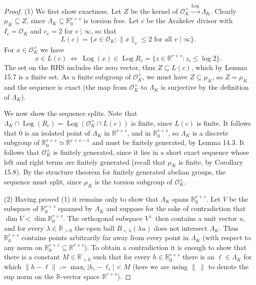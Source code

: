 \documentclass[UTF8,11pt]{ctexart}
\begin{document}
\begin{proof}
(1) We first show exactness. Let $Z$ be the kernel of $\mathcal O_K^\times\xrightarrow{\operatorname{Log}}\Lambda_K$. Clearly $\mu_K\subseteq Z$, since $\Lambda_K\subseteq\mathbb R^{r+s}_0$ is torsion free. Let $c$ be the Arakelov divisor with $I_c=\mathcal O_K$ and $c_v=2$ for $v\mid\infty$, so that
\[
L(c)=\{x\in\mathcal O_K:\|x\|_v\leq2\text{ for all }v\mid\infty\}.
\]
For $x\in\mathcal O_K^\times$ we have
\[
x\in L(c)\ \Longleftrightarrow\ \operatorname{Log}(x)\in\operatorname{Log}R_c
=\{z\in\mathbb R^{r+s}:z_i\leq\log2\}.
\]
The set on the RHS includes the zero vector, thus $Z\subseteq L(c)$, which by Lemma 15.7 is a finite set. As a finite subgroup of $\mathcal O_K^\times$, we must have $Z\subseteq\mu_K$, so $Z=\mu_K$ and the sequence is exact (the map from $\mathcal O_K^\times$ to $\Lambda_K$ is surjective by the definition of $\Lambda_K$).

We now show the sequence splits. Note that
$\Lambda_K\cap\operatorname{Log}(R_c)=\operatorname{Log}(\mathcal O_K^\times\cap L(c))$ is finite, since $L(c)$ is finite. It follows that $0$ is an isolated point of $\Lambda_K$ in $\mathbb R^{r+s}$, and in $\mathbb R^{r+s}_0$, so $\Lambda_K$ is a discrete subgroup of $\mathbb R^{r+s}_0\simeq\mathbb R^{r+s-1}$ and must be finitely generated, by Lemma 14.3. It follows that $\mathcal O_K^\times$ is finitely generated, since it lies in a short exact sequence whose left and right terms are finitely generated (recall that $\mu_K$ is finite, by Corollary 15.8). By the structure theorem for finitely generated abelian groups, the sequence must split, since $\mu_K$ is the torsion subgroup of $\mathcal O_K^\times$.

(2) Having proved (1) it remains only to show that $\Lambda_K$ spans $\mathbb R^{r+s}_0$. Let $V$ be the subspace of $\mathbb R^{r+s}_0$ spanned by $\Lambda_K$ and suppose for the sake of contradiction that $\dim V<\dim\mathbb R^{r+s}_0$. The orthogonal subspace $V^\perp$ then contains a unit vector $u$, and for every $\lambda\in\mathbb R_{>0}$ the open ball $B_{<\lambda}(\lambda u)$ does not intersect $\Lambda_K$. Thus $\mathbb R^{r+s}_0$ contains points arbitrarily far away from every point in $\Lambda_K$ (with respect to any norm on $\mathbb R^{r+s}_0\subseteq\mathbb R^{r+s}$). To obtain a contradiction it is enough to show that there is a constant $M\in\mathbb R_{>0}$ such that for every $h\in\mathbb R^{r+s}_0$ there is an $\ell\in\Lambda_K$ for which $\|h-\ell\|:=\max_i|h_i-\ell_i|<M$ (here we are using $\|\ \|$ to denote the sup norm on the $\mathbb R$-vector space $\mathbb R^{r+s}$).


\end{proof}
\end{document}
